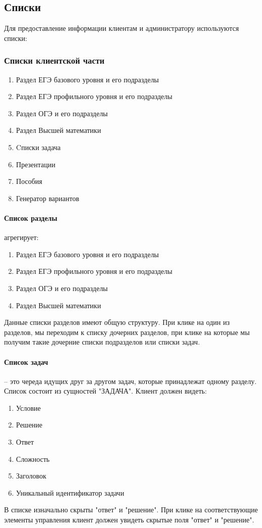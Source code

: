 \subsection{Списки}
Для предоставление информации клиентам и администратору используются списки:
\subsubsection{Списки клиентской части}
\begin{enumerate}
  \item Раздел ЕГЭ базового уровня и его подразделы
  \item Раздел ЕГЭ профильного уровня и его подразделы
  \item Раздел ОГЭ и его подразделы
  \item Раздел Высшей математики
  \item Cписки задача
  \item Презентации
  \item Пособия
  \item Генератор вариантов
\end{enumerate}

\paragraph{Список разделы} агрегирует:
\begin{enumerate}
  \item Раздел ЕГЭ базового уровня и его подразделы
  \item Раздел ЕГЭ профильного уровня и его подразделы
  \item Раздел ОГЭ и его подразделы
  \item Раздел Высшей математики
\end{enumerate}
Данные списки разделов имеют общую структуру. При клике на один из разделов, мы переходим к списку дочерних разделов, при клике на которые мы получим такие дочерние списки подразделов или списки задач.

\paragraph{Список задач} -- это череда идущих друг за другом задач, которые принадлежат одному разделу. Список состоит из сущностей "ЗАДАЧА". Клиент должен видеть:
\begin{enumerate}
  \item Условие
  \item Решение
  \item Ответ
  \item Сложность
  \item Заголовок
  \item Уникальный идентификатор задачи
\end{enumerate}
В списке изначально скрыты "ответ" и "решение". При клике на соответствующие элементы управления клиент должен увидеть скрытые поля "ответ" и "решение".

